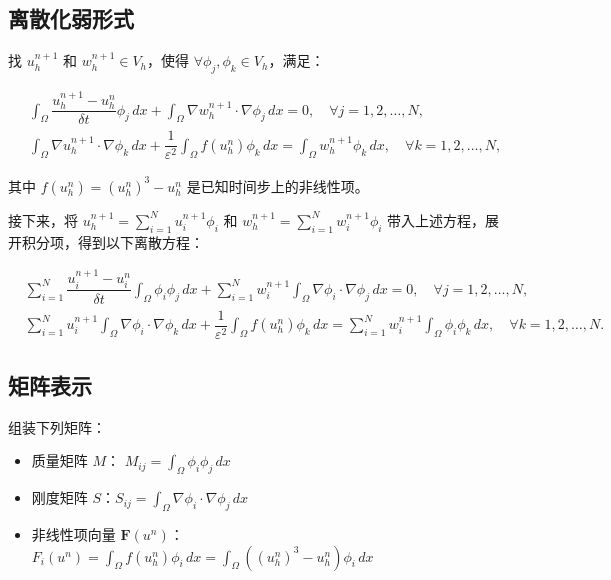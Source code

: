 \documentclass[12pt,a4paper]{article}
\begin{document}
	
	
	\subsection{离散化弱形式}
	
	找 \( u_h^{n+1} \) 和 \( w_h^{n+1} \in V_h \)，使得 \( \forall \phi_j, \phi_k \in V_h \)，满足：
	
	\begin{align}
		& \int_{\Omega} \dfrac{u_h^{n+1} - u_h^n}{\delta t} \phi_j \, dx + \int_{\Omega} \nabla w_h^{n+1} \cdot \nabla \phi_j \, dx = 0, \quad \forall j = 1,2,\ldots, N, \\
		& \int_{\Omega} \nabla u_h^{n+1} \cdot \nabla \phi_k \, dx + \dfrac{1}{\varepsilon^2} \int_{\Omega} f(u_h^n) \phi_k \, dx = \int_{\Omega} w_h^{n+1} \phi_k \, dx, \quad \forall k = 1,2,\ldots, N,
	\end{align}
	
	其中 \( f(u_h^n) = (u_h^n)^3 - u_h^n \) 是已知时间步上的非线性项。
	
	接下来，将 \( u_h^{n+1} = \sum_{i=1}^N u_i^{n+1} \phi_i \) 和 \( w_h^{n+1} = \sum_{i=1}^N w_i^{n+1} \phi_i \) 带入上述方程，展开积分项，得到以下离散方程：
	
	\begin{align}
		& \sum_{i=1}^N \dfrac{u_i^{n+1} - u_i^n}{\delta t} \int_{\Omega} \phi_i \phi_j \, dx + \sum_{i=1}^N w_i^{n+1} \int_{\Omega} \nabla \phi_i \cdot \nabla \phi_j \, dx = 0, \quad \forall j=1,2,\ldots,N, \\
		& \sum_{i=1}^N u_i^{n+1} \int_{\Omega} \nabla \phi_i \cdot \nabla \phi_k \, dx + \dfrac{1}{\varepsilon^2} \int_{\Omega} f(u_h^n) \phi_k \, dx = \sum_{i=1}^N w_i^{n+1} \int_{\Omega} \phi_i \phi_k \, dx, \quad \forall k=1,2,\ldots,N.
	\end{align}
	

	
	
	
	\subsection{矩阵表示}
	
	组装下列矩阵：
	
	\begin{itemize}
		\item 质量矩阵 \( M \)： \( M_{ij} = \int_{\Omega} \phi_i \phi_j \, dx \)
		\item 刚度矩阵 \( S \)：\( S_{ij} = \int_{\Omega} \nabla \phi_i \cdot \nabla \phi_j \, dx \)
		\item 非线性项向量 \( \mathbf{F}(u^n) \)：\( F_i(u^n) = \int_{\Omega} f(u_h^n) \phi_i \, dx = \int_{\Omega} \left((u_h^n)^3 - u_h^n\right) \phi_i \, dx \)
	\end{itemize}
	
\end{document}
